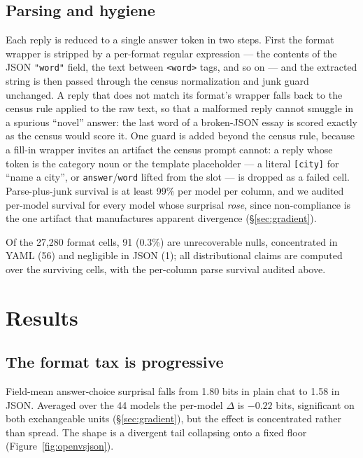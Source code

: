 \documentclass[11pt]{article}
\begin{document}
\subsection{Parsing and hygiene}
\label{sec:hygiene}
Each reply is reduced to a single answer token in two steps. First the format wrapper is
stripped by a per-format regular expression --- the contents of the JSON \texttt{"word"} field,
the text between \texttt{<word>} tags, and so on --- and the extracted string is then passed
through the census normalization and junk guard unchanged. A reply that does not match its
format's wrapper falls back to the census rule applied to the raw text, so that a malformed
reply cannot smuggle in a spurious ``novel'' answer: the last word of a broken-JSON essay is
scored exactly as the census would score it. One guard is added beyond the census rule, because
a fill-in wrapper invites an artifact the census prompt cannot: a reply whose token is the
category noun or the template placeholder --- a literal \texttt{[city]} for ``name a city'', or
\texttt{answer}/\texttt{word} lifted from the slot --- is
dropped as a failed cell. Parse-plus-junk survival is at least 99\% per
model per column, and we audited per-model survival for every model whose surprisal
\emph{rose}, since non-compliance is the one artifact that manufactures apparent divergence
(\S\ref{sec:gradient}).

Of the 27{,}280 format cells, 91 (0.3\%) are unrecoverable nulls, concentrated in YAML (56) and
negligible in JSON (1); all distributional claims are computed over the surviving cells, with
the per-column parse survival audited above.

\section{Results}
\label{sec:results}

\subsection{The format tax is progressive}
\label{sec:progressive}
Field-mean answer-choice surprisal falls from 1.80 bits in plain chat to 1.58 in JSON. Averaged
over the 44 models the per-model $\Delta$ is $-0.22$ bits, significant on both exchangeable
units (\S\ref{sec:gradient}), but the effect is concentrated rather than spread. The shape is a divergent tail collapsing onto a
fixed floor (Figure~\ref{fig:openvsjson}).
\end{document}

